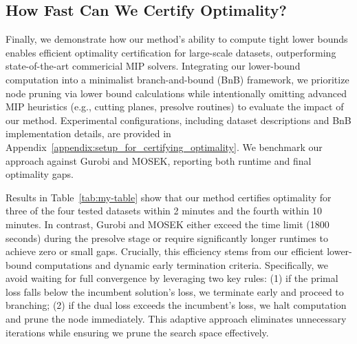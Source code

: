 \vspace{-0mm}
\subsection{How Fast Can We Certify Optimality?}
Finally, we demonstrate how our method's ability to compute tight lower bounds enables efficient optimality certification for large-scale datasets, outperforming state-of-the-art commericial MIP solvers.
Integrating our lower-bound computation into a minimalist branch-and-bound (BnB) framework, we prioritize node pruning via lower bound calculations while intentionally omitting advanced MIP heuristics (e.g., cutting planes, presolve routines) to evaluate the impact of our method.
Experimental configurations, including dataset descriptions and BnB implementation details, are provided in Appendix~\ref{appendix:setup_for_certifying_optimality}.
We benchmark our approach against Gurobi and MOSEK, reporting both runtime and final optimality gaps.


Results in Table~\ref{tab:my-table} show that our method certifies optimality for three of the four tested datasets within 2 minutes and the fourth within 10 minutes.
In contrast, Gurobi and MOSEK either exceed the time limit (1800 seconds) during the presolve stage or require significantly longer runtimes to achieve zero or small gaps.
Crucially, this efficiency stems from our efficient lower-bound computations and dynamic early termination criteria.
Specifically, we avoid waiting for full convergence by leveraging two key rules: 
(1) if the primal loss falls below the incumbent solution’s loss, we terminate early and proceed to branching; 
(2) if the dual loss exceeds the incumbent’s loss, we halt computation and prune the node immediately. This adaptive approach eliminates unnecessary iterations while ensuring we prune the search space effectively.





